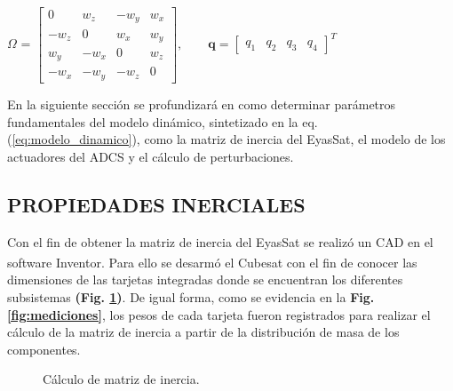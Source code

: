 \begin{center}
	$\Omega$ = $\left[\begin{array}{cccc}
		0 & w_z & -w_y & w_x \\
		-w_z & 0 & w_x & w_y \\
		w_y & -w_x & 0 & w_z \\
		-w_x & -w_y & -w_z & 0
	\end{array}\right],
	\qquad
	\mathbf{q}=\left[\begin{array}{llll}
		q_1 & q_2 & q_3 & q_4
	\end{array}\right]^T
	$
\end{center}
En la siguiente sección se profundizará en como determinar parámetros fundamentales del modelo dinámico, sintetizado en la eq. (\ref{eq:modelo_dinamico}), como la matriz de inercia del EyasSat, el modelo de los actuadores del ADCS y el cálculo de perturbaciones. 

\newpage
\subsection{PROPIEDADES INERCIALES}


Con el fin de obtener la matriz de inercia del EyasSat se realizó un CAD en el software Inventor\textsuperscript{\tiny\textregistered}. Para ello se desarmó el Cubesat con el fin de conocer las dimensiones de las tarjetas integradas donde se encuentran los diferentes subsistemas \textbf{(Fig. \ref{fig:eyassat_lab})}. De igual forma, como se evidencia en la \textbf{Fig. \ref{fig:mediciones}}, los pesos de cada tarjeta fueron registrados para realizar el cálculo de la matriz de inercia a partir de la distribución de masa de los componentes.


\begin{figure}[h]
	\centering
	
	\caption{Cálculo de matriz de inercia.}
	\label{fig:eyassat_lab}
\end{figure}

